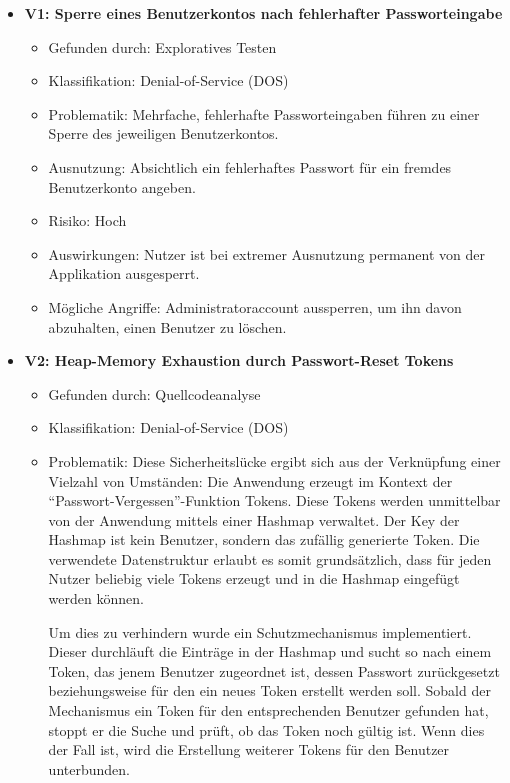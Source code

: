 \documentclass[12pt,DIV14,BCOR10mm,a4paper,parskip=half-,headsepline,headinclude,english,ngerman,bibliography=totocnumbered]{scrreprt}
\begin{document}
\begin{itemize}

  \hypertarget{vulnerability1}{}
  \item \textbf{V1: Sperre eines Benutzerkontos nach fehlerhafter Passworteingabe}
  \begin{itemize}
  \item Gefunden durch: Exploratives Testen
  \item Klassifikation: Denial-of-Service (DOS)
  \item Problematik: Mehrfache, fehlerhafte Passworteingaben führen zu einer Sperre des jeweiligen Benutzerkontos.
  \item Ausnutzung: Absichtlich ein fehlerhaftes Passwort für ein fremdes Benutzerkonto angeben.
  \item Risiko: Hoch
  \item Auswirkungen: Nutzer ist bei extremer Ausnutzung permanent von der Applikation ausgesperrt.
  \item Mögliche Angriffe: Administratoraccount aussperren, um ihn davon abzuhalten, einen Benutzer zu löschen.
  \end{itemize}

  \hypertarget{vulnerability2}{}
  \item \textbf{V2: Heap-Memory Exhaustion durch Passwort-Reset Tokens}
  \begin{itemize}
  \item Gefunden durch: Quellcodeanalyse
  \item Klassifikation: Denial-of-Service (DOS)
  \item Problematik: Diese Sicherheitslücke ergibt sich aus der Verknüpfung einer Vielzahl von Umständen: Die Anwendung erzeugt im Kontext der \enquote{Passwort-Vergessen}-Funktion Tokens. Diese Tokens werden unmittelbar von der Anwendung mittels einer Hashmap verwaltet. Der Key der Hashmap ist kein Benutzer, sondern das zufällig generierte Token. Die verwendete Datenstruktur erlaubt es somit grundsätzlich, dass für jeden Nutzer beliebig viele Tokens erzeugt und in die Hashmap eingefügt werden können.

  Um dies zu verhindern wurde ein Schutzmechanismus implementiert. Dieser durchläuft die Einträge in der Hashmap und sucht so nach einem Token, das jenem Benutzer zugeordnet ist, dessen Passwort zurückgesetzt beziehungsweise für den ein neues Token erstellt werden soll. Sobald der Mechanismus ein Token für den entsprechenden Benutzer gefunden hat, stoppt er die Suche und prüft, ob das Token noch gültig ist. Wenn dies der Fall ist, wird die Erstellung weiterer Tokens für den Benutzer unterbunden.


\end{itemize}
\end{itemize}
\end{document}
